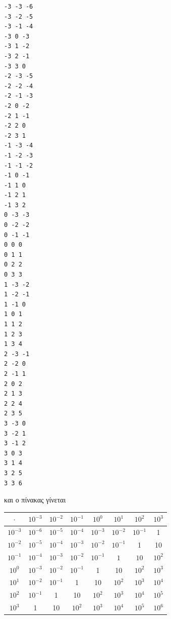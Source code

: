 \begin{lstlisting}
-3 -3 -6
-3 -2 -5
-3 -1 -4
-3 0 -3
-3 1 -2
-3 2 -1
-3 3 0
-2 -3 -5
-2 -2 -4
-2 -1 -3
-2 0 -2
-2 1 -1
-2 2 0
-2 3 1
-1 -3 -4
-1 -2 -3
-1 -1 -2
-1 0 -1
-1 1 0
-1 2 1
-1 3 2
0 -3 -3
0 -2 -2
0 -1 -1
0 0 0
0 1 1
0 2 2
0 3 3
1 -3 -2
1 -2 -1
1 -1 0
1 0 1
1 1 2
1 2 3
1 3 4
2 -3 -1
2 -2 0
2 -1 1
2 0 2
2 1 3
2 2 4
2 3 5
3 -3 0
3 -2 1
3 -1 2
3 0 3
3 1 4
3 2 5
3 3 6
\end{lstlisting}
και ο πίνακας γίνεται
\begin{table}[ht]
\begin{tabular}{|c|c|c|c|c|c|c|c|}
$\cdot$&$10^{-3}$&$10^{-2}$&$10^{-1}$&$10^0$&$10^1$&$10^2$&$10^3$\\\hline
$10^{-3}$&$10^{-6}$&$10^{-5}$&$10^{-4}$&$10^{-3}$&$10^{-2}$&$10^{-1}$&1\\\hline
$10^{-2}$&$10^{-5}$&$10^{-4}$&$10^{-3}$&$10^{-2}$&$10^{-1}$&1&10\\\hline
$10^{-1}$&$10^{-4}$&$10^{-3}$&$10^{-2}$&$10^{-1}$&$1$&$10$&$10^2$\\\hline
$10^{0}$&$10^{-3}$&$10^{-2}$&$10^{-1}$&1&10&$10^2$&$10^3$\\\hline
$10^{1}$&$10^{-2}$&$10^{-1}$&1&10&$10^2$&$10^3$&$10^4$\\\hline
$10^{2}$&$10^{-1}$&1&10&$10^2$&$10^3$&$10^4$&$10^5$\\\hline
$10^{3}$&1&10&$10^2$&$10^3$&$10^4$&$10^5$&$10^6$\\\hline
\end{tabular}
\end{table}
